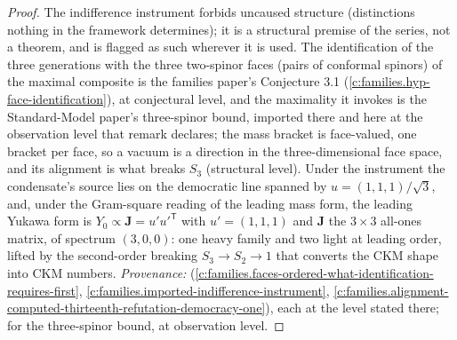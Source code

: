 \documentclass[11pt]{article}
\theoremstyle{definition}
\theoremstyle{plain}
\providecommand{\J}{}\renewcommand{\J}{\mathbf{J}}
\begin{document}
\begin{proof}
The indifference instrument forbids uncaused structure (distinctions nothing in the framework determines); it is a structural premise of the series, not a theorem, and is flagged as such wherever it is used. The identification of the three generations with the three two-spinor faces (pairs of conformal spinors) of the maximal composite is the families paper's Conjecture 3.1 (\ref{c:families.hyp-face-identification}), at conjectural level, and the maximality it invokes is the Standard-Model paper's three-spinor bound, imported there and here at the observation level that remark declares; the mass bracket is face-valued, one bracket per face, so a vacuum is a direction in the three-dimensional face space, and its alignment is what breaks $S_{3}$ (structural level). Under the instrument the condensate's source lies on the democratic line spanned by $u = (1,1,1)/\sqrt{3}$, and, under the Gram-square reading of the leading mass form, the leading Yukawa form is $Y_{0} \propto \J = u'u'^{\mathsf{T}}$ with $u' = (1,1,1)$ and $\J$ the $3 \times 3$ all-ones matrix, of spectrum $(3, 0, 0)$: one heavy family and two light at leading order, lifted by the second-order breaking $S_{3} \to S_{2} \to 1$ that converts the CKM shape into CKM numbers. \emph{Provenance:} \cite[Fact~2.5, Conj.~3.1, Prop.~4.3, Prop.~4.4(1)]{ButlerT13} (\ref{c:families.faces-ordered-what-identification-requires-first}, \ref{c:families.imported-indifference-instrument}, \ref{c:families.alignment-computed-thirteenth-refutation-democracy-one}), each at the level stated there; \cite[Rem.~3.3]{ButlerT12} for the three-spinor bound, at observation level.

\end{proof}
\end{document}
